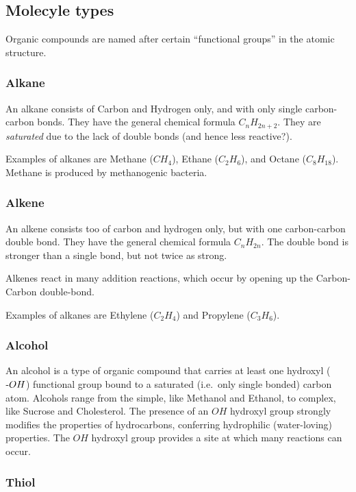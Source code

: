 \documentclass[a4paper,14pt]{extarticle}
\def\mhyphen{{\hbox{-}}}
\begin{document}
\subsection{Molecyle types}

Organic compounds are named after certain ``functional groups'' in the atomic structure.

\subsubsection{Alkane}

An alkane consists of Carbon and Hydrogen only, and with only single carbon-carbon bonds.
They have the general chemical formula $C_{n}H_{2n+2}$. They are {\em saturated\/}
due to the lack of double bonds (and hence less reactive?).

Examples of alkanes are Methane ($CH_4$), Ethane ($C_2H_6$), and Octane ($C_{8}H_{18}$).
Methane is produced by methanogenic bacteria.

\subsubsection{Alkene}

An alkene consists too of carbon and hydrogen only, but with one carbon-carbon double bond.
They have the general chemical formula $C_{n}H_{2n}$. The double bond is stronger than
a single bond, but not twice as strong.

Alkenes react in many addition reactions, which occur by opening up the Carbon-Carbon
double-bond.

Examples of alkanes are Ethylene ($C_2H_4$) and Propylene ($C_3H_6$).

\subsubsection{Alcohol}

An alcohol is a type of organic compound that carries at least one hydroxyl
(${\mhyphen}OH$) functional group bound to a saturated (i.e.\ only single bonded) carbon
atom. Alcohols range from the simple, like Methanol and Ethanol, to complex, like Sucrose
and Cholesterol. The presence of an $OH$ hydroxyl group strongly modifies the properties
of hydrocarbons, conferring hydrophilic (water-loving) properties. The $OH$ hydroxyl group
provides a site at which many reactions can occur.

\subsubsection{Thiol}
\end{document}
